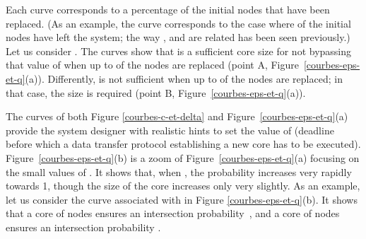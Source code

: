 \documentclass[]{llncs}
\begin{document}
Each curve corresponds to a percentage of the initial nodes that have 
been replaced. (As an example, the  curve  corresponds  to the case
where   of  the initial nodes have left the system; 
the way ,  and  are related has been seen previously.) 
Let us consider . The curves show that  is
a sufficient core  size for not bypassing that value  of  when up
to  of the nodes  are replaced (point A, Figure~\ref{courbes-eps-et-q}(a)). 
Differently,    is  not sufficient when up to    of the  nodes
are  replaced;   in that   case, the  size    is required  (point B,
Figure~\ref{courbes-eps-et-q}(a)).   


The curves of both Figure \ref{courbes-c-et-delta} and Figure~\ref{courbes-eps-et-q}(a) 
provide the system designer with realistic hints
to set the value of  (deadline before which a data transfer
protocol establishing a new core has to be executed). 
Figure~\ref{courbes-eps-et-q}(b) is  a zoom of Figure~\ref{courbes-eps-et-q}(a) focusing on the small values of  .  
It shows that, when , the probability 
 increases very rapidly towards 1, though the size of the 
core increases only very slightly.   As an   example, let   us
consider  the  curve associated with  in  
Figure \ref{courbes-eps-et-q}(b). It shows that a
core of  nodes ensures an intersection probability~,
and  a   core   of    nodes  ensures   an  intersection  probability
. 
\end{document}
